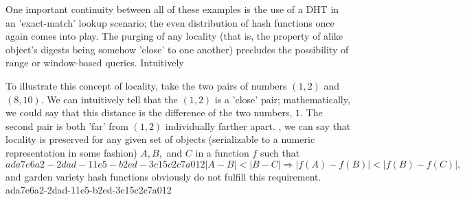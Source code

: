 \documentclass[12pt]{article}
\begin{document}
\par One important continuity between all of these examples is the use of a DHT in an 'exact-match' lookup scenario; the even distribution of hash functions once again comes into play. The purging of any locality (that is, the property of alike object's digests being somehow 'close' to one another) precludes the possibility of range or window-based queries. Intuitively

\par To illustrate this concept of locality, take the two pairs of numbers $(1,2)$ and $(8,10)$. We can intuitively tell that the $(1,2)$ is a 'close' pair; mathematically, we could say that this distance is the difference of the two numbers, $1$. The second pair is both 'far' from $(1,2)$ individually farther apart. , we can say that locality is preserved for any given set of objects (serializable to a numeric representation in some fashion) $A,B,$ and $C$ in a function $f$ such that
\begin{equation}
ada7e6a2-2dad-11e5-b2ed-3c15c2c7a012|A-B| < |B-C| \Rightarrow |f(A)-f(B)| < |f(B) - f(C)|,
\end{equation}
and garden variety hash functions obviously do not fulfill this requirement.
ada7e6a2-2dad-11e5-b2ed-3c15c2c7a012
\printbibliography
\end{document}

